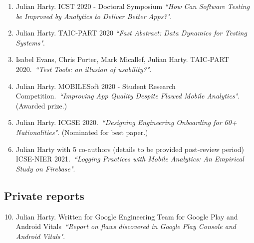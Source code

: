 \begin{enumerate}
    \item Julian Harty. ICST 2020 - Doctoral Symposium \emph{``How Can Software Testing be Improved by Analytics to Deliver Better Apps?"}.
    
    \item Julian Harty. TAIC-PART 2020 \emph{``Fast Abstract: Data Dynamics for Testing Systems"}.
    
    \item Isabel Evans, Chris Porter, Mark Micallef, Julian Harty. TAIC-PART 2020.~\emph{``Test Tools: an illusion of usability?"}.
    
    \item Julian Harty. MOBILESoft 2020 - Student Research Competition.~\emph{``Improving App Quality Despite Flawed Mobile Analytics"}. (Awarded  prize.)
    
    \item Julian Harty. ICGSE 2020.~\emph{``Designing Engineering Onboarding for 60+ Nationalities"}. (Nominated for best paper.)
    
    \item Julian Harty with 5 co-authors (details to be provided post-review period) ICSE-NIER 2021.~\emph{``Logging Practices with Mobile Analytics: An Empirical Study on Firebase"}.  

\end{enumerate}

\subsection{Private reports}
\begin{enumerate}

    \setcounter{enumi}{9}
    \item Julian Harty. Written for Google Engineering Team for Google Play and Android Vitals~\emph{``Report on flaws discovered in Google Play Console and Android Vitals"}.

\end{enumerate}

